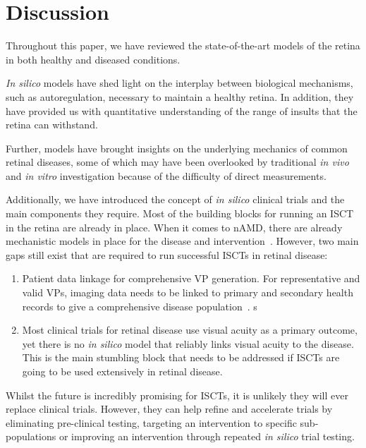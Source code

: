 \documentclass{article}
\begin{document}
\section{Discussion}\label{sec:Conclusion}

Throughout this paper, we have reviewed the state-of-the-art models of the retina in both healthy and diseased conditions.

\textit{In silico} models have shed light on the interplay between biological mechanisms, such as autoregulation, necessary to maintain a healthy retina.
In addition, they have provided us with quantitative understanding of the range of insults that the retina can withstand.

Further, models have brought insights on the underlying mechanics of common retinal diseases, some of which may have been overlooked by traditional \textit{in vivo} and \textit{in vitro} investigation because of the difficulty of direct measurements.

Additionally, we have introduced the concept of \textit{in silico} clinical trials and the main components they require. 
Most of the building blocks for running an ISCT in the retina are already in place. When it comes to nAMD, there are already mechanistic models in place for the disease and intervention~\cite{Hoyle_2017, Vega2021}. However, two main gaps still exist that are required to run successful ISCTs in retinal disease: 

\begin{enumerate}
\item{Patient data linkage for comprehensive VP generation. For representative and valid VPs, imaging data needs to be linked to primary and secondary health records to give a comprehensive disease population~\cite{ElBouri2021}.}
s
\item{Most clinical trials for retinal disease use visual acuity as a primary outcome, yet there is no \textit{in silico} model that reliably links visual acuity to the disease. This is the main stumbling block that needs to be addressed if ISCTs are going to be used extensively in retinal disease.}
\end{enumerate}

Whilst the future is incredibly promising for ISCTs, it is unlikely they will ever replace clinical trials. However, they can help refine and accelerate trials by eliminating pre-clinical testing, targeting an intervention to specific sub-populations or improving an intervention through repeated \textit{in silico} trial testing.


{}
\end{document}

